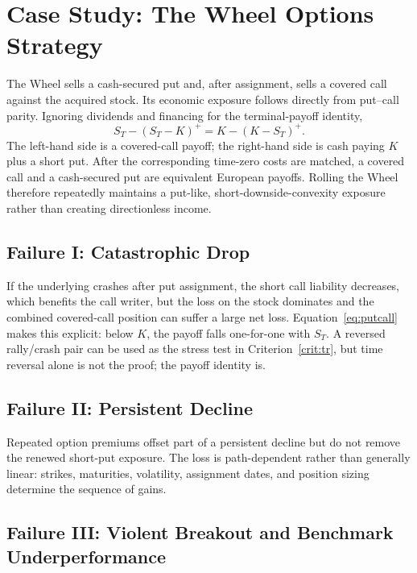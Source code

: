 \documentclass[aps,pra,reprint,superscriptaddress,amsmath,amssymb]{revtex4-2}
\theoremstyle{plain}
\theoremstyle{definition}
\theoremstyle{remark}
\begin{document}
\section{Case Study: The Wheel Options Strategy}
\label{sec:wheel}

The Wheel sells a cash-secured put and, after assignment, sells a covered call
against the acquired stock. Its economic exposure follows directly from
put--call parity. Ignoring dividends and financing for the terminal-payoff
identity,
\begin{equation}
  S_T-(S_T-K)^+
  =K-(K-S_T)^+.
  \label{eq:putcall}
\end{equation}
The left-hand side is a covered-call payoff; the right-hand side is cash
paying \(K\) plus a short put. After the corresponding time-zero costs are
matched, a covered call and a cash-secured put are equivalent European
payoffs. Rolling the Wheel therefore repeatedly maintains a put-like,
short-downside-convexity exposure rather than creating directionless income.

\subsection{Failure I: Catastrophic Drop}

If the underlying crashes after put assignment, the short call liability
decreases, which benefits the call writer, but the loss on the stock dominates
and the combined covered-call position can suffer a large net loss.
Equation~\eqref{eq:putcall} makes this explicit: below \(K\), the payoff falls
one-for-one with \(S_T\). A reversed rally/crash pair can be used as the stress
test in Criterion~\ref{crit:tr}, but time reversal alone is not the proof; the
payoff identity is.

\subsection{Failure II: Persistent Decline}

Repeated option premiums offset part of a persistent decline but do not remove
the renewed short-put exposure. The loss is path-dependent rather than
generally linear: strikes, maturities, volatility, assignment dates, and
position sizing determine the sequence of gains.

\subsection{Failure III: Violent Breakout and Benchmark Underperformance}
\end{document}
